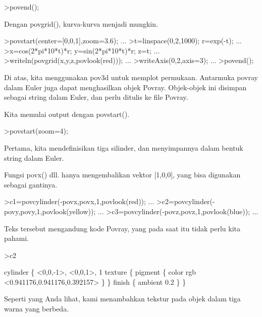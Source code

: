 \documentclass{article}
\begin{document}
\begin{eulernotebook}
\begin{eulerprompt}
>povend();
\end{eulerprompt}
\begin{eulercomment}
Dengan povgrid(), kurva-kurva menjadi mungkin.
\end{eulercomment}
\begin{eulerprompt}
>povstart(center=[0,0,1],zoom=3.6); ...
>t=linspace(0,2,1000); r=exp(-t); ...
>x=cos(2*pi*10*t)*r; y=sin(2*pi*10*t)*r; z=t; ...
>writeln(povgrid(x,y,z,povlook(red))); ...
>writeAxis(0,2,axis=3); ...
>povend();
\end{eulerprompt}
\begin{eulercomment}
Di atas, kita menggunakan pov3d untuk memplot permukaan. Antarmuka
povray dalam Euler juga dapat menghasilkan objek Povray. Objek-objek
ini disimpan sebagai string dalam Euler, dan perlu ditulis ke file
Povray.

Kita memulai output dengan povstart().
\end{eulercomment}
\begin{eulerprompt}
>povstart(zoom=4);
\end{eulerprompt}
\begin{eulercomment}
Pertama, kita mendefinisikan tiga silinder, dan menyimpannya dalam
bentuk string dalam Euler.

Fungsi povx() dll. hanya mengembalikan vektor [1,0,0], yang bisa
digunakan sebagai gantinya.
\end{eulercomment}
\begin{eulerprompt}
>c1=povcylinder(-povx,povx,1,povlook(red)); ...
>c2=povcylinder(-povy,povy,1,povlook(yellow)); ...
>c3=povcylinder(-povz,povz,1,povlook(blue)); ...
\end{eulerprompt}
\begin{eulercomment}
Teks tersebut mengandung kode Povray, yang pada saat itu tidak perlu
kita pahami.
\end{eulercomment}
\begin{eulerprompt}
>c2
\end{eulerprompt}
\begin{euleroutput}
  cylinder \{ <0,0,-1>, <0,0,1>, 1
   texture \{ pigment \{ color rgb <0.941176,0.941176,0.392157> \}  \} 
   finish \{ ambient 0.2 \} 
   \}
\end{euleroutput}
\begin{eulercomment}
Seperti yang Anda lihat, kami menambahkan tekstur pada objek dalam
tiga warna yang berbeda.


\end{eulercomment}
\end{eulernotebook}
\end{document}
